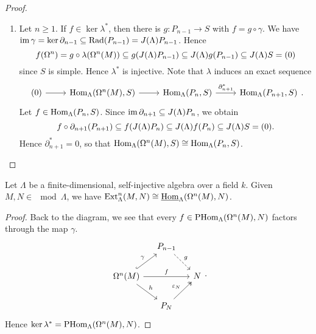 \begin{proof}
\begin{enumerate}
%
\item Let $n \ge 1$. If $f \in \ker \lambda^*$, then there is $g:P_{n-1} \to S$ with $f = g \circ \gamma$. We have $\operatorname{im} \gamma = \ker \partial_{n-1} \subseteq \operatorname{Rad}(P_{n-1}) = J(\Lambda)P_{n-1}$. Hence
  \[ f(\Omega^n) =  g \circ \lambda(\Omega^n(M)) \subseteq g( J(\Lambda)P_{n-1}) \subseteq  J(\Lambda)g(P_{n-1}) \subseteq  J(\Lambda) S = (0) \]
  since $S$ is simple. Hence $\lambda^*$ is injective. Note that $\lambda$ induces an
  exact sequence
  \[
    \begin{tikzcd}
      (0) \ar[r]& \Hom_\Lambda(\Omega^n(M),S) \ar[r] & \Hom_\Lambda(P_n,S) \ar[r,
      "\partial_{n+1}^*"]& \Hom_\Lambda(P_{n+1},S)
    \end{tikzcd}.
  \]
  Let $f \in \operatorname{Hom}_\Lambda(P_n,S)$. Since $\operatorname{im} \partial_{n+1} \subseteq J(\Lambda)P_n$, we obtain
  \[
  f \circ \partial_{n+1}(P_{n+1}) \subseteq f( J(\Lambda)P_n) \subseteq J(\Lambda)f(P_n) \subseteq  J(\Lambda)S = (0).
  \]
  Hence $\partial_{n+1}^* = 0$, so that $\operatorname{Hom}_\Lambda(\Omega^n(M),S) \cong \operatorname{Hom}_\Lambda(P_n,S)$.\qedhere
\end{enumerate}
\end{proof}


\begin{corollary}\label{2.3.2}
  Let $\Lambda$ be a finite-dimensional, self-injective algebra over a field $k$.
  Given $M,N \in \mod{\Lambda}$, we have $\operatorname{Ext}_\Lambda^n(M,N) \cong \underline{\mathrm{Hom}}_\Lambda(\Omega^n(M),N)$.
\end{corollary}


\begin{proof}
Back to the diagram, we see that every $f \in \operatorname{PHom}_\Lambda(\Omega^n(M), N)$ factors through the map
$\gamma$.
\[
\begin{tikzcd}[column sep=small]
& P_{n-1} \ar[dr,"g",dashed] \\
\Omega^n(M) \ar[ur, hook, "\gamma"] \ar[rr,"f"] \ar[dr,"h"] & & N \\
& P_N \ar[ur,"\varepsilon_N",two heads] 
\end{tikzcd}.
\]
Hence $\ker \lambda^* = \operatorname{PHom}_\Lambda(\Omega^n(M),N)$.
\end{proof}


